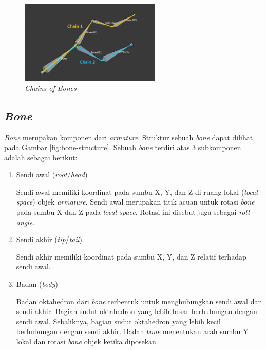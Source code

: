 \begin{figure}[ht]
    \centering
    \includegraphics[width=0.6\textwidth]{resources/chapter-2-chain-of-bones.png}
    \caption{\textit{Chains of Bones} \parencite{blender-manual}}
    \label{fig:chains-of-bones}
\end{figure}

\subsection{\textit{Bone}}

\textit{Bone} merupakan komponen dari \textit{armature}. Struktur sebuah
\textit{bone} dapat dilihat pada Gambar \ref{fig:bone-structure}. Sebuah
\textit{bone} terdiri atas 3 subkomponen adalah sebagai berikut:

\begin{enumerate}

    \item Sendi awal (\textit{root}/\textit{head})

    Sendi awal memiliki koordinat pada sumbu X, Y, dan Z di ruang lokal
    (\textit{local space}) objek \textit{armature}. Sendi awal merupakan titik
    acuan untuk rotasi \textit{bone} pada sumbu X dan Z pada \textit{local
    space}. Rotasi ini disebut juga sebagai \textit{roll angle}.

    \item Sendi akhir (\textit{tip}/\textit{tail})

    Sendi akhir memiliki koordinat pada sumbu X, Y, dan Z relatif terhadap sendi
    awal.

    \item Badan (\textit{body})

    Badan oktahedron dari \textit{bone} terbentuk untuk menghubungkan sendi awal
    dan sendi akhir. Bagian sudut oktahedron yang lebih besar berhubungan dengan
    sendi awal. Sebaliknya, bagian sudut oktahedron yang lebih kecil berhubungan
    dengan sendi akhir. Badan \textit{bone} menentukan arah sumbu Y lokal dan
    rotasi \textit{bone} objek ketika diposekan.

\end{enumerate}

